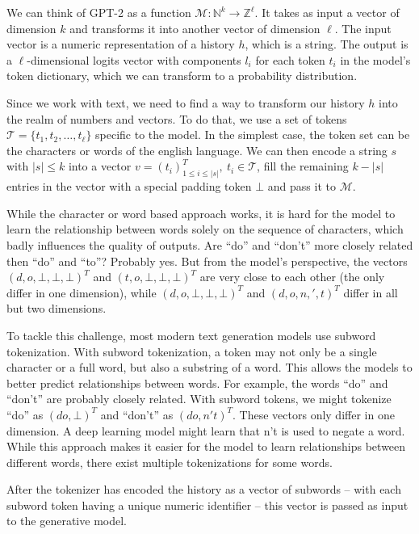 We can think of GPT-2 as a function $\mathcal{M} \colon \mathbb{N}^k \rightarrow \mathbb{Z}^\ell$. 
It takes as input a vector of dimension $k$ and transforms it into another vector of dimension $\ell$. 
The input vector is a numeric representation of a history $h$, which is a string.
The output is a $\ell$-dimensional logits vector with components $l_i$ for each token $t_i$ in the model's token dictionary, which we can transform to a probability distribution.

Since we work with text, we need to find a way to transform our history $h$ into the realm of numbers and vectors.
To do that, we use a set of tokens $\mathcal{T} = \{ t_1, t_2, \dots, t_\ell \}$ specific to the model.
In the simplest case, the token set can be the characters or words of the english language.
We can then encode a string $s$ with $|s| \leq k$ into a vector $v = \left(t_i\right)^T_{1 \leq i \leq |s|}, ~t_i \in \mathcal{T}$, fill the remaining $k - |s|$ entries in the vector with a special padding token $\bot$ and pass it to $\mathcal{M}$.
	
While the character or word based approach works, it is hard for the model to learn the relationship between words solely on the sequence of characters, which badly influences the quality of outputs.
Are ``do'' and ``don't'' more closely related then ``do'' and ``to''?
Probably yes.
But from the model's perspective, the vectors $(d, o, \bot, \bot, \bot)^T$ and $(t, o, \bot, \bot, \bot)^T$ are very close to each other (the only differ in one dimension), while $(d, o, \bot, \bot, \bot)^T$ and $(d, o, n, ', t)^T$ differ in all but two dimensions.

To tackle this challenge, most modern text generation models use subword tokenization.
With subword tokenization, a token may not only be a single character or a full word, but also a substring of a word.
This allows the models to better predict relationships between words.
For example, the words ``do'' and ``don't'' are probably closely related.
With subword tokens, we might tokenize ``do'' as $(do, \bot)^T$ and ``don't'' as $(do, n't)^T$.
These vectors only differ in one dimension.
A deep learning model might learn that n't is used to negate a word.
While this approach makes it easier for the model to learn relationships between different words, there exist multiple tokenizations for some words.

After the tokenizer has encoded the history as a vector of subwords -- with each subword token having a unique numeric identifier -- this vector is passed as input to the generative model.

